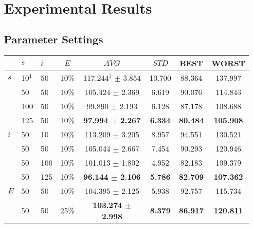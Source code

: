 \chapter{Experimental Results}
\label{appendixC}

\section{Parameter Settings}

\begin{table}
    \centering
    \begin{tabular}{|l|l|l|c||c|c|c|c|}
    \hline
    ~ & $s$ & $i$ & $E$ & $AVG$ & $STD$ & BEST & WORST \\
    \hline
    $s$ & 10$^1$ & 50 & 10\% & 117.244$^1$ $\pm$ 3.854 & 10.700 & 88.364 & 137.997\\
    ~ & 50 & 50 & 10\% & 105.424 $\pm$ 2.369 & 6.619 & 90.076 & 114.843\\
    ~ & 100 & 50 & 10\% & 99.890 $\pm$ 2.193 & 6.128 & 87.178 & 108.688\\
    ~ & 125 & 50 & 10\% & \textbf{97.994 $\pm$ 2.267} & \textbf{6.334} & \textbf{80.484} & \textbf{105.908}\\
    \hline
    $i$ & 50 & 10 & 10\% & 113.209 $\pm$ 3.205 & 8.957 & 94.551 & 130.521\\
    ~ & 50 & 50 & 10\% & 105.044 $\pm$ 2.667 & 7.454 & 90.293 & 120.946\\
    ~ & 50 & 100 & 10\% & 101.013 $\pm$ 1.802 & 4.952 & 82.183 & 109.379\\
    ~ & 50 & 125 & 10\% & \textbf{96.144 $\pm$ 2.106} & \textbf{5.786} & \textbf{82.709} & \textbf{107.362}\\
    \hline
    $E$ & 50 & 50 & 10\% & 104.395 $\pm$ 2.125 & 5.938 & 92.757 & 115.734\\
    ~ & 50 & 50 & 25\% & \textbf{103.274 $\pm$ 2.998} & \textbf{8.379} & \textbf{86.917} & \textbf{120.811}\\

\end{tabular}
\end{table}
